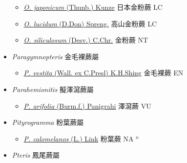 \begin{itemize}
  \begin{itemize}
        \item[] \href{http://www.theplantlist.org/tpl1.1/search?q=Onychium+japonicum}{\textit{O. japonicum} (Thunb.) Kunze}   日本金粉蕨 LC
        \item[] \href{http://www.theplantlist.org/tpl1.1/search?q=Onychium+lucidum}{\textit{O. lucidum} (D.Don) Spreng.}     高山金粉蕨 LC
        \item[] \href{http://www.theplantlist.org/tpl1.1/search?q=Onychium+siliculosum}{\textit{O. siliculosum} (Desv.) C.Chr.}   金粉蕨 NT
  \end{itemize}
 \item[] \textit{Paragymnopteris} 金毛裸蕨屬
                    
  \begin{itemize}
        \item[] \href{http://www.theplantlist.org/tpl1.1/search?q=Paragymnopteris+vestita}{\textit{P. vestita} (Wall. ex C.Presl) K.H.Shing}   金毛裸蕨 EN
  \end{itemize}
 \item[] \textit{Parahemionitis} 擬澤瀉蕨屬
                    
  \begin{itemize}
        \item[] \href{http://www.theplantlist.org/tpl1.1/search?q=Parahemionitis+arifolia}{\textit{P. arifolia} (Burm.f.) Panigrahi}   澤瀉蕨 VU
  \end{itemize}
 \item[] \textit{Pityrogramma} 粉葉蕨屬
                    
  \begin{itemize}
        \item[] \href{http://www.theplantlist.org/tpl1.1/search?q=Pityrogramma+calomelanos}{\textit{P. calomelanos} (L.) Link}   粉葉蕨 NA $^n$
  \end{itemize}
 \item[] \textit{Pteris} 鳳尾蕨屬
                    

\end{itemize}

